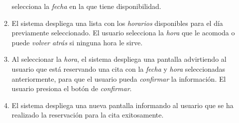 \documentclass[letter, 10pt]{article}
\begin{document}
\begin{enumerate}
\begin{enumerate}
		selecciona la \emph{fecha} en la que tiene disponibilidad.
	\item El sistema despliega una lista con los \emph{horarios} disponibles para el día previamente seleccionado. El
		usuario selecciona la \emph{hora} que le acomoda o puede \emph{volver atrás} si ninguna hora le sirve.
	\item Al seleccionar la \emph{hora}, el sistema despliega una pantalla advirtiendo al usuario que está reservando
		una cita con la \emph{fecha} y \emph{hora} seleccionadas anteriormente, para que el usuario pueda \emph{confirmar} la información.
		El usuario presiona el botón de \emph{confirmar}.
	\item El sistema despliega una nueva pantalla informando al usuario que se ha realizado la reservación para la cita
		exitosamente.
   \end{enumerate}
\end{enumerate}
\end{document}
